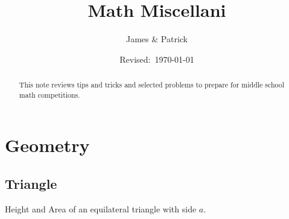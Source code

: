 \documentclass[12pt]{article}
\title{Math Miscellani}
\author{James \& Patrick}
\date{Revised:~\today}
\begin{document}
\maketitle
\begin{minipage}{\textwidth}
\maketitle
\begin{abstract}
This note reviews tips and tricks and selected problems to prepare for middle school math competitions.
\end{abstract}
\end{minipage}

\thispagestyle{empty}
\clearpage
\addtocounter{page}{-1}

\section*{Geometry}

\subsection*{Triangle}
Height and Area of an equilateral triangle with side $a$.
\end{document}
